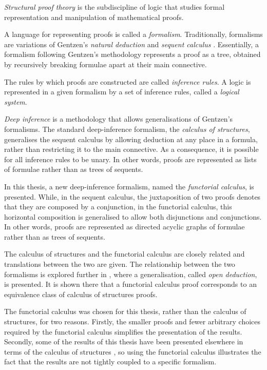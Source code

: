 \emph{Structural proof theory} is the subdiscipline of logic that studies formal representation and manipulation of mathematical proofs.

A language for representing proofs is called a \emph{formalism}. Traditionally, formalisms are variations of Gentzen's \emph{natural deduction} and \emph{sequent calculus} \cite{Gent:69:Investig:xi}. Essentially, a formalism following Gentzen's methodology represents a proof as a tree, obtained by recursively breaking formulae apart at their main connective.

The rules by which proofs are constructed are called \emph{inference rules}. A logic is represented in a given formalism by a set of inference rules, called a \emph{logical system}.

\emph{Deep inference} \cite{Gugl:06:A-System:kl} is a methodology that allows generalisations of Gentzen's formalisms. The standard deep-inference formalism, the \emph{calculus of structures}, generalises the sequent calculus by allowing deduction at any place in a formula, rather than restricting it to the main connective. As a consequence, it is possible for all inference rules to be unary. In other words, proofs are represented as lists of formulae rather than as trees of sequents.

In this thesis, a new deep-inference formalism, named the \emph{functorial calculus}, is presented. While, in the sequent calculus, the juxtaposition of two proofs denotes that they are composed by a conjunction, in the functorial calculus, this horizontal composition is generalised to allow both disjunctions and conjunctions. In other words, proofs are represented as directed acyclic graphs of formulae rather than as trees of sequents.

The calculus of structures and the functorial calculus are closely related and translations between the two are given. The relationship between the two formalisms is explored further in \cite{GuglGundPari::A-Proof-:fk}, where a generalisation, called \emph{open deduction}, is presented. It is shown there that a functorial calculus proof corresponds to an equivalence class of calculus of structures proofs.

The functorial calculus was chosen for this thesis, rather than the calculus of structures, for two reasons. Firstly, the smaller proofs and fewer arbitrary choices required by the functorial calculus simplifies the presentation of the results. Secondly, some of the results of this thesis have been presented elsewhere in terms of the calculus of structures \cite{GuglGund:07:Normalis:lr,BrusGuglGundPari:09:Quasip:fk,GuglGundStra::Breaking:uq}, so using the functorial calculus illustrates the fact that the results are not tightly coupled to a specific formalism.

